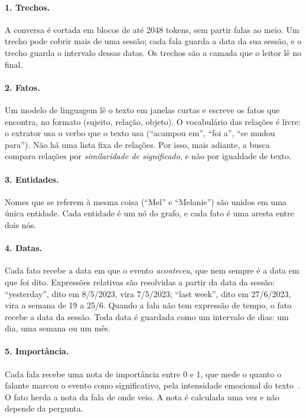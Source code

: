 \documentclass[11pt]{article}
\begin{document}
\paragraph{1. Trechos.} A conversa é cortada em blocos de até 2048 tokens,
sem partir falas ao meio. Um trecho pode cobrir mais de uma sessão; cada fala
guarda a data da sua sessão, e o trecho guarda o intervalo dessas datas.
Os trechos são a camada que o leitor lê no final.

\paragraph{2. Fatos.} Um modelo de linguagem lê o texto em janelas curtas e
escreve os fatos que encontra, no formato (sujeito, relação, objeto). O
vocabulário das relações é livre: o extrator usa o verbo que o texto usa
(``acampou em'', ``foi a'', ``se mudou para''). Não há uma lista fixa de
relações. Por isso, mais adiante, a busca compara relações por
\emph{similaridade de significado}, e não por igualdade de texto.

\paragraph{3. Entidades.} Nomes que se referem à mesma coisa (``Mel'' e
``Melanie'') são unidos em uma única entidade. Cada entidade é um nó do
grafo, e cada fato é uma aresta entre dois nós.

\paragraph{4. Datas.} Cada fato recebe a data em que o evento
\emph{aconteceu}, que nem sempre é a data em que foi dito. Expressões
relativas são resolvidas a partir da data da sessão: ``yesterday'', dito em
8/5/2023, vira 7/5/2023; ``last week'', dito em 27/6/2023, vira a semana de
19 a 25/6. Quando a fala não tem expressão de tempo, o fato recebe a data da
sessão. Toda data é guardada como um intervalo de dias: um dia, uma semana ou
um mês.

\paragraph{5. Importância.} Cada fala recebe uma nota de importância entre 0
e 1, que mede o quanto o falante marcou o evento como significativo, pela
intensidade emocional do texto~\citep{flexa2026bridging,mcgaugh2004amygdala}.
O fato herda a nota da fala de onde veio. A nota é calculada uma vez e não
depende da pergunta.
\end{document}
